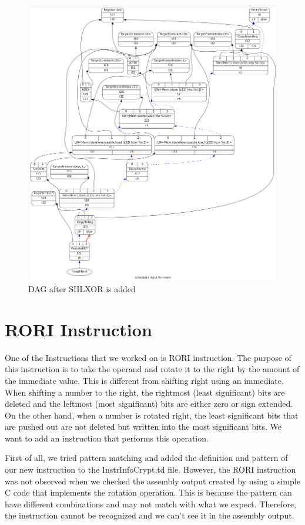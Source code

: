\begin{figure}[h!]
    \centering
    \includegraphics[scale= 0.3]{adding_new_instr/shlxor_after.png}
    \caption{DAG after SHLXOR is added}
    \label{fig:shlxor_after}
\end{figure}

\section{RORI Instruction}
One of the Instructions that we worked on is RORI instruction. The purpose of this instruction is to take the operand and rotate it to the right by the amount of the immediate value. This is different from shifting right using an immediate. When shifting a number to the right, the rightmost (least significant) bits are deleted and the leftmost (most significant) bits are either zero or sign extended. On the other hand, when a number is rotated right, the least significant bits that are pushed out are not deleted but written into the most significant bits. We want to add an instruction that performs this operation.

First of all, we tried pattern matching and added the definition and pattern of our new instruction to the InstrInfoCrypt.td file. However, the RORI instruction was not observed when we checked the assembly output created by using a simple C code that implements the rotation operation. This is because the pattern can have different combinations and may not match with what we expect. Therefore, the instruction cannot be recognized and we can’t see it in the assembly output.

